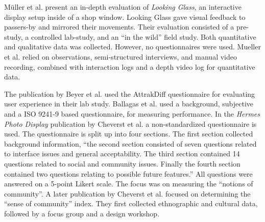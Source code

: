 	M{\"u}ller et al. \cite{Muller2012LookingGlass} present an in-depth evaluation of \textit{Looking Glass}, an interactive display setup inside of a shop window. Looking Glass gave visual feedback to passers-by and mirrored their movements. Their evaluation consisted of a pre-study, a controlled lab-study, and an ``in the wild'' field study. Both quantitative and qualitative data was collected. However, no questionnaires were used. Mueller et al. relied on observations, semi-structured interviews, and manual video recording, combined with interaction logs and a depth video log for quantitative data.

	The publication by Beyer et al. \cite{Beyer2011} used the AttrakDiff questionnaire for evaluating user experience in their lab study. 
	Ballagas et al. \cite{Ballagas2005} used a background, subjective and a ISO 9241-9 based questionnaire, for measuring performance.
	In the \textit{Hermes Photo Display} publication by Cheverst et al. \cite{cheverst2005hermes} a non-standardized questionnaire is used. The questionnaire is split up into four sections. The first section collected background information, ``the second section consisted of seven questions related to interface issues and general acceptability. The third section contained 14 questions related to social and community issues. Finally the fourth section contained two questions relating to possible future features.'' All questions were answered on a 5-point Likert scale. The focus was on measuring the ``notions of community''.
	A later publication by Cheverst et al. \cite{Cheverst2008} focused on determining the ``sense of community'' index. They first collected ethnographic and cultural data, followed by a focus group and a design workshop.








